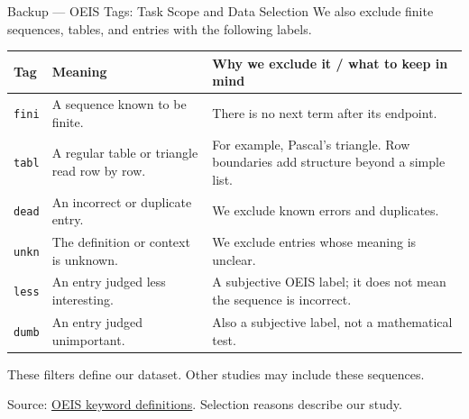 \documentclass[aspectratio=169,10pt]{beamer}
\newcommand{\readout}[1]{\textcolor{readoutblue}{{\mdseries #1}}}
\begin{document}
\begin{frame}{Backup --- OEIS Tags: Task Scope and Data Selection}
\small
\setlength{\parskip}{0pt}
\readout{We also exclude finite sequences, tables, and entries with the following labels.}
\par\medskip
{\footnotesize
\renewcommand{\arraystretch}{1.25}
\begin{tabular}{@{}p{0.9cm}p{5.0cm}p{7.0cm}@{}}
\toprule
\textbf{Tag} & \textbf{Meaning} & \textbf{Why we exclude it / what to keep in mind} \\
\midrule
\texttt{fini} & A sequence known to be finite.
 & There is no next term after its endpoint. \\
\texttt{tabl} & A regular table or triangle read row by row.
 & For example, Pascal's triangle. Row boundaries add structure beyond a simple list. \\
\texttt{dead} & An incorrect or duplicate entry.
 & We exclude known errors and duplicates. \\
\texttt{unkn} & The definition or context is unknown.
 & We exclude entries whose meaning is unclear. \\
\texttt{less} & An entry judged less interesting.
 & A subjective OEIS label; it does not mean the sequence is incorrect. \\
\texttt{dumb} & An entry judged unimportant.
 & Also a subjective label, not a mathematical test. \\
\bottomrule
\end{tabular}}
\par\medskip
\readout{These filters define our dataset. Other studies may include these sequences.}
\par\smallskip
{\scriptsize Source: \href{https://oeis.org/wiki/Keywords}{OEIS keyword definitions}. Selection reasons describe our study.}
\end{frame}
\end{document}
